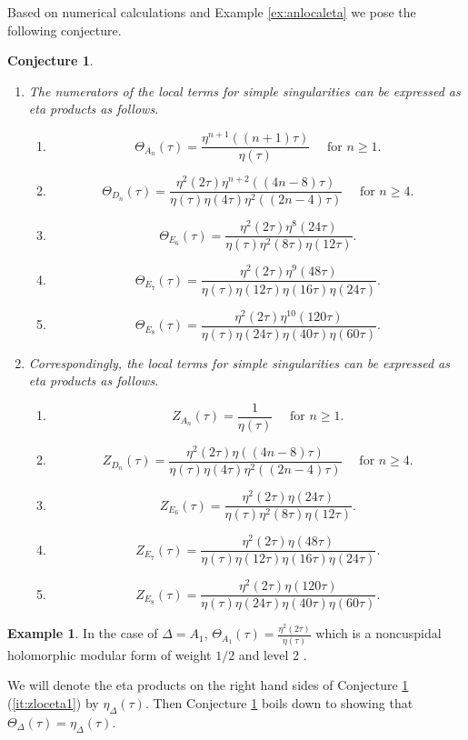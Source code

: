 \documentclass[11pt,a4paper]{amsart}
\newtheorem{conjecture}[theorem]{Conjecture}
\theoremstyle{definition}
\newtheorem{example}[theorem]{Example}
\newcommand{\SC}{\mathbb{C}}                    %
\begin{document}
Based on numerical calculations and Example \ref{ex:anlocaleta} we pose the following conjecture.
\begin{conjecture}
	\label{conj:zloceta}
	
	\begin{enumerate}
\item
\label{it:zloceta1}
 The numerators of the local terms for simple singularities can be expressed as eta products as follows.
		\begin{enumerate}
		\item \[\Theta_{A_n}(\tau)= \frac{\eta^{n+1}{((n+1)\tau)}}{\eta(\tau)}\quad\textrm{ for } n\geq 1.\]
		\item
		\[\Theta_{D_n}(\tau)= \frac{\eta^2(2\tau)\eta^{n+2}((4n-8)\tau)}{\eta(\tau)\eta(4\tau)\eta^2((2n-4)\tau)} \quad\textrm{ for } n \geq 4. \]
		\item \[\Theta_{E_6}(\tau)= \frac{\eta^2(2\tau)\eta^{8}(24\tau)}{\eta(\tau)\eta^2(8\tau)\eta(12\tau)}.\]
		\item \[\Theta_{E_7}(\tau)= \frac{\eta^2(2\tau)\eta^{9}(48\tau)}{\eta(\tau)\eta(12\tau)\eta(16\tau)\eta(24\tau)}.\]
		\item \[\Theta_{E_8}(\tau)= \frac{\eta^2(2\tau)\eta^{10}(120\tau)}{\eta(\tau)\eta(24\tau)\eta(40\tau)\eta(60\tau)}.\]
	\end{enumerate}
\item\label{it:zloceta2} Correspondingly, the local terms for simple singularities can be expressed as eta products as follows.
	\begin{enumerate}
		\item \[Z_{A_n}(\tau)= \frac{1}{\eta(\tau)}\quad\textrm{ for } n\geq 1.\]
		\item
		\[Z_{D_n}(\tau)= \frac{\eta^2(2\tau)\eta((4n-8)\tau)}{\eta(\tau)\eta(4\tau)\eta^2((2n-4)\tau)} \quad\textrm{ for } n \geq 4. \]
		\item \[Z_{E_6}(\tau)= \frac{\eta^2(2\tau)\eta(24\tau)}{\eta(\tau)\eta^2(8\tau)\eta(12\tau)}.\]
		\item \[Z_{E_7}(\tau)= \frac{\eta^2(2\tau)\eta(48\tau)}{\eta(\tau)\eta(12\tau)\eta(16\tau)\eta(24\tau)}.\]
		\item \[Z_{E_8}(\tau)= \frac{\eta^2(2\tau)\eta(120\tau)}{\eta(\tau)\eta(24\tau)\eta(40\tau)\eta(60\tau)}.\]
	\end{enumerate}
\end{enumerate}
\end{conjecture}
\begin{example} In the case of $\Delta=A_1$, $\Theta_{A_1}(\tau)=\frac{\eta^2(2\tau)}{\eta(\tau)}$ which is a noncuspidal holomorphic modular form of weight $1/2$ and level 2 \cite[Example 3.12 (1)]{kohler2011eta}.\end{example}
We will denote the eta products on the right hand sides of Conjecture \ref{conj:zloceta} (\ref{it:zloceta1}) by $\eta_{\Delta}(\tau)$. Then Conjecture \ref{conj:zloceta} boils down to showing that $\Theta_{\Delta}(\tau)=\eta_{\Delta}(\tau)$. 
\end{document}
